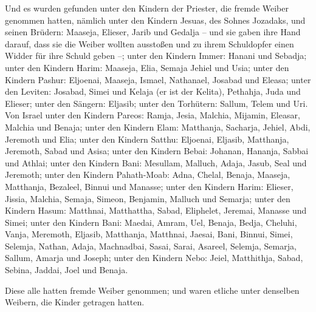  Und es wurden gefunden unter den Kindern der Priester,
die fremde Weiber genommen hatten, nämlich unter den Kindern Jesuas, des
Sohnes Jozadaks, und seinen Brüdern: Maaseja, Elieser, Jarib und Gedalja
 -- und sie gaben ihre Hand darauf, dass sie die Weiber
wollten ausstoßen und zu ihrem Schuldopfer einen Widder für ihre Schuld
geben --;  unter den Kindern Immer: Hanani und Sebadja;
 unter den Kindern Harim: Maaseja, Elia, Semaja Jehiel
und Usia;  unter den Kindern Pashur: Eljoenai, Maaseja,
Ismael, Nathanael, Josabad und Eleasa;  unter den
Leviten: Josabad, Simei und Kelaja (er ist der Kelita), Pethahja, Juda
und Elieser;  unter den Sängern: Eljasib; unter den
Torhütern: Sallum, Telem und Uri.  Von Israel unter den
Kindern Pareos: Ramja, Jesia, Malchia, Mijamin, Eleasar, Malchia und
Benaja;  unter den Kindern Elam: Matthanja, Sacharja,
Jehiel, Abdi, Jeremoth und Elia;  unter den Kindern
Satthu: Eljoenai, Eljasib, Matthanja, Jeremoth, Sabad und Asisa;
 unter den Kindern Bebai: Johanan, Hananja, Sabbai und
Athlai;  unter den Kindern Bani: Mesullam, Malluch,
Adaja, Jasub, Seal und Jeremoth;  unter den Kindern
Pahath-Moab: Adna, Chelal, Benaja, Maaseja, Matthanja, Bezaleel, Binnui
und Manasse;  unter den Kindern Harim: Elieser, Jissia,
Malchia, Semaja, Simeon,  Benjamin, Malluch und Semarja;
 unter den Kindern Hasum: Matthnai, Matthattha, Sabad,
Eliphelet, Jeremai, Manasse und Simei;  unter den Kindern
Bani: Maedai, Amram, Uel,  Benaja, Bedja, Cheluhi,
 Vanja, Meremoth, Eljasib,  Matthanja,
Matthnai, Jaesai,  Bani, Binnui, Simei, 
Selemja, Nathan, Adaja,  Machnadbai, Sasai, Sarai,
 Asareel, Selemja, Semarja,  Sallum,
Amarja und Joseph;  unter den Kindern Nebo: Jeiel,
Matthithja, Sabad, Sebina, Jaddai, Joel und Benaja.

 Diese alle hatten fremde Weiber genommen; und waren
etliche unter denselben Weibern, die Kinder getragen hatten.
